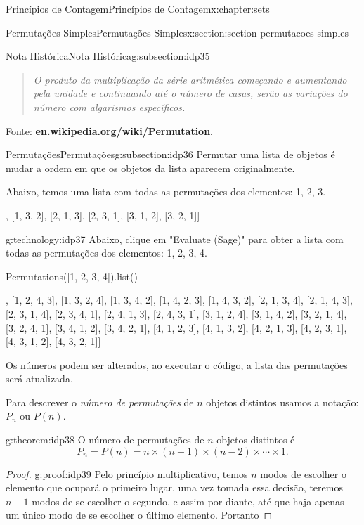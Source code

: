 \documentclass[oneside,10pt,]{book}
\newcommand{\terminology}[1]{\textbf{#1}}
\numberwithin{equation}{section}
\begin{document}
\begin{chapterptx}{Princípios de Contagem}{}{Princípios de Contagem}{}{}{x:chapter:sets}
\begin{sectionptx}{Permutações Simples}{}{Permutações Simples}{}{}{x:section:section-permutacoes-simples}
\begin{subsectionptx}{Nota Histórica}{}{Nota Histórica}{}{}{g:subsection:idp35}
\begin{quote}%
\emph{O produto da multiplicação da série aritmética começando e aumentando pela unidade e continuando até o número de casas, serão as variações do número com algarismos específicos.}\end{quote}
Fonte: \href{https://en.wikipedia.org/wiki/Permutation}{\terminology{en.wikipedia.org\slash{}wiki\slash{}Permutation}}.%
\end{subsectionptx}
%
%
\typeout{************************************************}
\typeout{************************************************}
%
\begin{subsectionptx}{Permutações}{}{Permutações}{}{}{g:subsection:idp36}
Permutar uma lista de objetos é mudar a ordem em que os objetos da lista aparecem originalmente.%
\par
Abaixo, temos uma lista com todas as permutações dos elementos: 1, 2, 3.%
\par
[[1, 2, 3], [1, 3, 2], [2, 1, 3], [2, 3, 1], [3, 1, 2], [3, 2, 1]]%
\begin{technology}{}{g:technology:idp37}%
Abaixo, clique em "Evaluate (Sage)" para obter a lista com todas as permutações dos elementos: 1, 2, 3, 4.%
\begin{sageinput}
Permutations([1, 2, 3, 4]).list()
\end{sageinput}
\begin{sageoutput}
[[1, 2, 3, 4],
 [1, 2, 4, 3],
 [1, 3, 2, 4],
 [1, 3, 4, 2],
 [1, 4, 2, 3],
 [1, 4, 3, 2],
 [2, 1, 3, 4],
 [2, 1, 4, 3],
 [2, 3, 1, 4],
 [2, 3, 4, 1],
 [2, 4, 1, 3],
 [2, 4, 3, 1],
 [3, 1, 2, 4],
 [3, 1, 4, 2],
 [3, 2, 1, 4],
 [3, 2, 4, 1],
 [3, 4, 1, 2],
 [3, 4, 2, 1],
 [4, 1, 2, 3],
 [4, 1, 3, 2],
 [4, 2, 1, 3],
 [4, 2, 3, 1],
 [4, 3, 1, 2],
 [4, 3, 2, 1]]
\end{sageoutput}
Os números podem ser alterados, ao executar o código, a lista das permutações será atualizada.%
\end{technology}
Para descrever o \emph{número de permutações} de \(n\) objetos distintos usamos a notação: \(P_n\) ou \(P(n)\).%
\begin{theorem}{}{}{g:theorem:idp38}%
O número de permutações de \(n \) objetos distintos é%
\begin{equation*}
P_n = P(n) = n\times (n-1) \times (n-2)\times \cdots \times 1. 
\end{equation*}
\end{theorem}
\begin{proof}{}{g:proof:idp39}
Pelo princípio multiplicativo, temos \(n\) modos de escolher o elemento que ocupará o primeiro lugar, uma vez tomada essa decisão, teremos \(n-1\) modos de se escolher o segundo, e assim por diante, até que haja apenas um único modo de se escolher o último elemento. Portanto%

\end{proof}
\end{subsectionptx}
\end{sectionptx}
\end{chapterptx}
\end{document}
